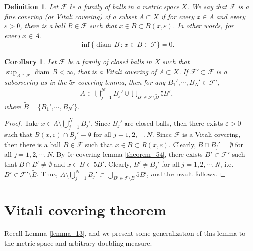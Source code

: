 \documentclass[11pt]{book}
\newtheorem{definition}{Definition}[chapter]
\newtheorem{corollary}{Corollary}[theorem]
\theoremstyle{definition}
\numberwithin{equation}{chapter}
\def\diam{{\operatorname{diam}\,}}
\begin{document}
\medskip

\begin{definition}
Let $\mathcal{F}$ be a family of balls in a metric space $X$. We say that $\mathcal{F}$ is a fine covering (or Vitali covering) of a subset $A \subset X$ if for every $x \in A$ and every $\varepsilon > 0$, there is a ball $B \in \mathcal{F}$ such that $x \in B \subset B(x,\varepsilon)$. In other words, for every $x \in A$,
\begin{align*}
    \inf \{\diam B \,:\, x \in B \in \mathcal{F}\} = 0.
\end{align*}
\end{definition}

\medskip

\begin{corollary}\label{coro_541}
Let $\mathcal{F}$ be a family of closed balls in $X$ such that $\sup_{B \in \mathcal{F}} \diam B < \infty$, that is a Vitali covering of $A \subset X$. If $\mathcal{F}' \subset \mathcal{F}$ is a subcovering as in the $5r$-covering lemma, then for any $B_1', \cdots, B_N' \in \mathcal{F}'$,
\begin{align*}
    A \subset \bigcup^N_{j=1} B_j' \cup \bigcup_{B' \in \mathcal{F} \setminus \widetilde{B}} 5B',
\end{align*}
where $\widetilde{B} = \{B_1',\cdots,B_N'\}$.
\end{corollary}
\begin{proof}
Take $x \in A \setminus \bigcup^N_{j=1} B_j'$. Since $B_j'$ are closed balls, then there exists $\varepsilon > 0$ such that $B(x,\varepsilon) \cap B_j' = \emptyset$ for all $j = 1,2,\cdots,N$. Since $\mathcal{F}$ is a Vitali covering, then there is a ball $B \in \mathcal{F}$ such that $x \in B \subset B(x,\varepsilon)$. Clearly, $B \cap B_j' = \emptyset$ for all $j = 1,2,\cdots,N$. By $5r$-covering lemma \ref{theorem_54}, there exists $B' \subset \mathcal{F}'$ such that $B \cap B' \neq \emptyset$ and $x \in B \subset 5B'$. Clearly, $B' \neq B_j'$ for all $j = 1,2,\cdots,N$, i.e. $B' \in \mathcal{F}' \setminus \widetilde{B}$. Thus, $A \setminus \bigcup^N_{j=1} B_j' \subset \bigcup_{B' \in \mathcal{F} \setminus \widetilde{B}} 5B'$, and the result follows.
\end{proof}

\section{Vitali covering theorem}

Recall Lemma \ref{lemma_13}, and we present some generalization of this lemma to the metric space and arbitrary doubling measure.
\end{document}
